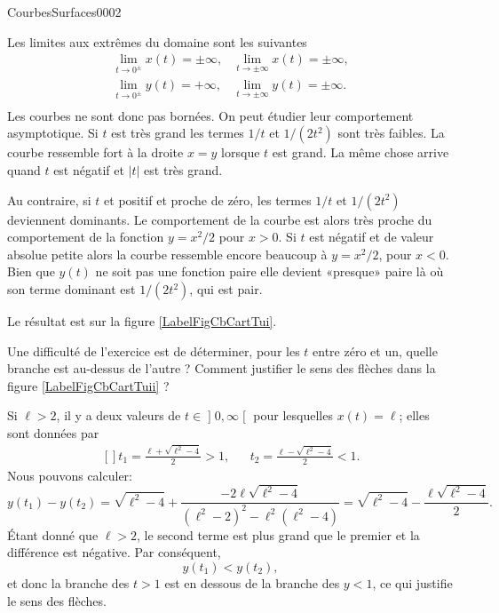 \begin{corrige}{CourbesSurfaces0002}
\begin{enumerate}
Les limites aux extrêmes du domaine sont les suivantes
\begin{equation}
  \begin{array}{ll}
    \lim_{t\to 0^{\pm}}x(t)=\pm \infty, & \lim_{t\to \pm\infty}x(t)=\pm \infty,\\
    \lim_{t\to 0^{\pm}}y(t)=+ \infty, & \lim_{t\to \pm\infty}y(t)=\pm \infty.\\
  \end{array}
\end{equation}
Les courbes ne sont donc pas bornées. On peut étudier leur comportement asymptotique. Si $t$ est très grand les termes $1/t$ et $1/(2t^2)$ sont très faibles. La courbe ressemble fort à la droite $x=y$ lorsque $t$ est grand. La même chose arrive quand $t$ est négatif et $|t|$ est très grand. 

Au contraire, si $t$ et positif et proche de zéro, les termes $1/t$ et $1/(2t^2)$ deviennent dominants. Le comportement de la courbe est alors très proche du comportement de la fonction $y=x^2/2$ pour $x>0$. Si $t$ est négatif et de valeur absolue petite alors la courbe ressemble encore beaucoup à $y=x^2/2$, pour $x<0$. Bien que $y(t)$ ne soit  pas une fonction paire elle devient «presque» paire là où son terme dominant est $1/(2t^2)$, qui est pair.

Le résultat est sur la figure \ref{LabelFigCbCartTui}.
\newcommand{\CaptionFigCbCartTui}{La courbe de l'exercice \ref{exoCourbesSurfaces0002}\ref{Itemzzdexoi}}


Une difficulté de l'exercice est de déterminer, pour les \( t\) entre zéro et un, quelle branche est au-dessus de l'autre ? Comment justifier le sens des flèches dans la figure \ref{LabelFigCbCartTuii} ?

Si \( \ell>2\), il y a deux valeurs de \( t\in\mathopen] 0 , \infty \mathclose[\) pour lesquelles \( x(t)=\ell\); elles sont données par
\begin{equation}
    \begin{aligned}[]
        t_1=\frac{ \ell+\sqrt{\ell^2-4} }{ 2 }>1,&&t_2=\frac{ \ell-\sqrt{\ell^2-4} }{ 2 }<1.
    \end{aligned}
\end{equation}
Nous pouvons calculer:
\begin{equation}
    y(t_1)-y(t_2)=\sqrt{\ell^2-4}+\frac{ -2\ell\sqrt{\ell^2-4} }{ (\ell^2-2)^2-\ell^2(\ell^2-4) }=\sqrt{\ell^2-4}-\frac{ \ell\sqrt{\ell^2-4} }{ 2 }.
\end{equation}
Étant donné que \( \ell>2\), le second terme est plus grand que le premier et la différence est négative. Par conséquent,
\begin{equation}
    y(t_1)<y(t_2),
\end{equation}
et donc la branche des \( t>1\) est en dessous de la branche des \( y<1\), ce qui justifie le sens des flèches.



\end{enumerate}
\end{corrige}
